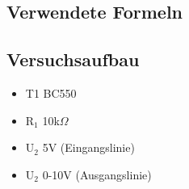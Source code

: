 \documentclass[12pt,a4paper]{article}
\begin{document}
\subsection{Verwendete Formeln}
\subsection{Versuchsaufbau}

\begin{itemize}
\item	T1 BC550

\item	R$_1$ 10k$\Omega$

\item	U$_2$ 5V (Eingangslinie)

\item	U$_2$ 0-10V (Ausgangslinie)
\end{itemize}
\end{document}
